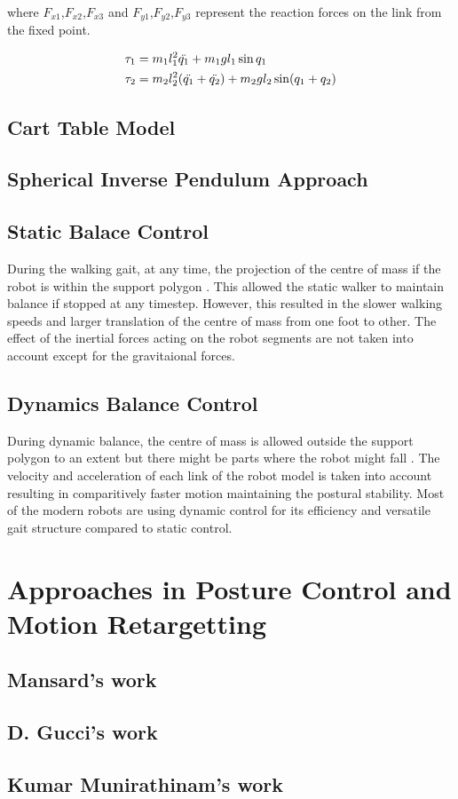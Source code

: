 where $F_{x1}$,$F_{x2}$,$F_{x3}$ and $F_{y1}$,$F_{y2}$,$F_{y3}$ represent the reaction forces on the link from the fixed point.

\begin{equation}
\begin{split}
    \tau_1 &= m_1l_1^2\Ddot{q_1} + m_1gl_1\sin{q_1} \\
    \tau_2 &= m_2l_2^2 (\Ddot{q_1} + \Ddot{q_2}) + m_2gl_2\sin(q_1+q_2)
\end{split}
\end{equation}

\subsection{Cart Table Model}


\subsection{Spherical Inverse Pendulum Approach}

\subsection{Static Balace Control}

During the walking gait, at any time, the projection of the centre of mass if the robot is within the support
polygon \cite{katic2003survey}. This allowed the static walker to maintain balance if stopped at any timestep.
However, this resulted in the slower walking speeds and larger translation of the centre of mass from one foot to
other. The effect of the inertial forces acting on the robot segments are not taken into account except for the 
gravitaional forces.

\subsection{ Dynamics Balance Control}

During dynamic balance, the centre of mass is allowed outside the support polygon to an extent but there might be 
parts where the robot might fall \cite{katic2003survey}. The velocity and acceleration of each link of the robot
model is taken into account resulting in comparitively faster motion maintaining the postural stability. Most of the
modern robots are using dynamic control for its efficiency and versatile gait structure compared to static control.


\section{Approaches in Posture Control and Motion Retargetting}
\subsection{Mansard's work}
\subsection{D. Gucci's work}
\subsection{Kumar Munirathinam's work}

